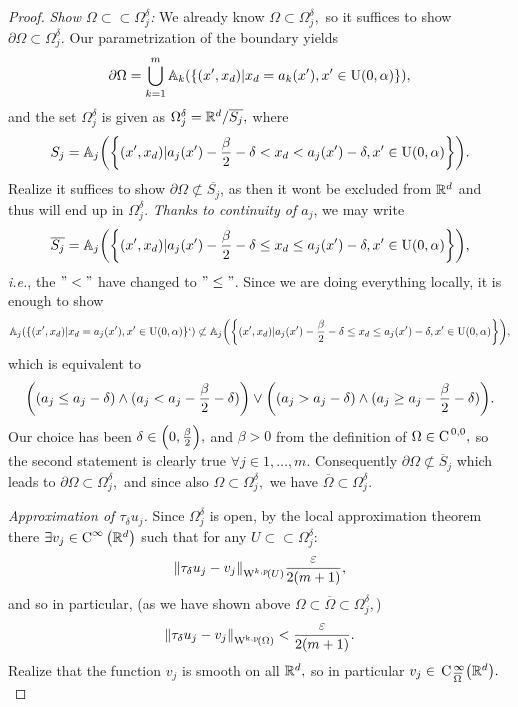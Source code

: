 \documentclass{article}
\begin{document}
\begin{proof}
\textit{Show $\Omega \subset \subset \Omega_j^{\delta}$:}
We already know $\Omega \subset \Omega_j^{\delta},$ so it suffices to show $\partial \Omega \subset \Omega_j^{\delta}.$ Our parametrization of the boundary yields
\[
	\partial \Omega = \bigcup_{k=1}^m \mathbb{A}_k\qty(\qty{(x',x_d)| x_d = a_k(x'), x' \in \text{U}(0,\alpha)}),
\]
and the set $\Omega_j^{\delta}$ is given as $\Omega_{j}^{\delta} = {\mathbb R}^{d} / \overline{S_j},$ where
\[
	S_j = \mathbb{A}_j\qty(\qty{(x',x_d)| a_j(x') - \frac{\beta}{2} - \delta < x_d < a_j(x') - \delta, x' \in \text{U}(0,\alpha)}).
\]
Realize it suffices to show $\partial \Omega \not \subset \overline{S_j}$, as then it wont be excluded from ${\mathbb R}^{d}$ and thus will end up in $\Omega_j^\delta.$ \textit{Thanks to continuity of $a_j$}, we may write
\[
	\overline{S_j} = \mathbb{A}_j\qty(\qty{(x',x_d)| a_j(x') - \frac{\beta}{2} - \delta \leq x_d \leq a_j(x') - \delta, x' \in \text{U}(0,\alpha)}),
\]
\textit{i.e.}, the $"<"$ have changed to $"\leq"$. Since we are doing everything locally, it is enough to show
\[
	\mathbb{A}_j\qty(\qty{(x',x_d)|x_d = a_j(x'), x' \in \text{U}(0,\alpha)}`) \not \subset \mathbb{A}_j\qty(\qty{(x',x_d)| a_j(x') - \frac{\beta}{2} - \delta \leq x_d \leq a_j(x') - \delta, x' \in \text{U}(0,\alpha)}),
\]
which is equivalent to
\[
	\qty((a_j \leq a_j - \delta) \wedge (a_j < a_j - \frac{\beta}{2} - \delta)) \vee \qty((a_j > a_j - \delta) \wedge (a_j \geq a_j - \frac{\beta}{2} - \delta)).
\]
Our choice has been $\delta \in \qty(0, \frac{\beta}{2}),$ and $\beta > 0$ from the definition of $\Omega \in \text{C}^{\!\,\, 0,0},$ so the second statement is clearly true $\forall j \in {1, \dots, m}$. Consequently $\partial \Omega \not \subset \overline{S}_j$ which leads to $\partial \Omega \subset \Omega_j^{\delta},$ and since also $\Omega \subset \Omega_j^{\delta},$ we have $\overline{\Omega} \subset \Omega_j^{\delta}.$

\textit{Approximation of $\tau_{\delta}u_j$.}
Since $\Omega_{j}^\delta$ is open, by the local approximation theorem there $\exists v_j \in \text{C}^{\infty}\!\,\left({\mathbb R}^{d} \right)$ such that for any $U \subset \subset \Omega_j^{\delta}$:
\[
	\norm{\tau_{\delta}u_j - v_j}_{\WkpSet[k][p]{U}} \frac{\varepsilon}{2\qty(m+1)},
\]
and so in particular, (as we have shown above $\Omega \subset \overline{\Omega} \subset \Omega_{j}^\delta,$)
\[
	\norm{\tau_{\delta}u_j - v_j}_{\WkpSet{\Omega}}  < \frac{\varepsilon}{2(m+1)}.
\]
Realize that the function $v_j$ is smooth on all ${\mathbb R}^{d},$ so in particular $v_j \in \, \text{C} \,_{\overline{\Omega}}^{\infty}\qty({\mathbb R}^{d}).$



\end{proof}
\end{document}
